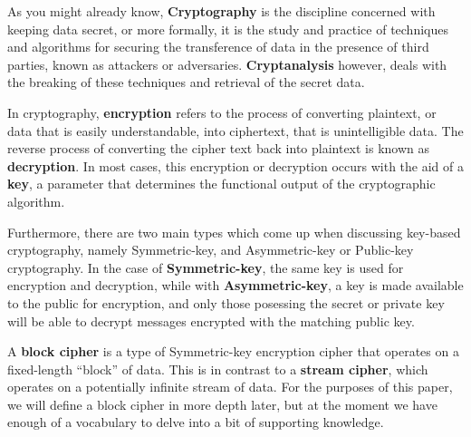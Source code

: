 As you might already know, \textbf{Cryptography} is the discipline concerned
with keeping data secret, or more formally, it is the study and practice of
techniques and algorithms for securing the transference of data in the presence
of third parties, known as attackers or adversaries.  \textbf{Cryptanalysis}
however, deals with the breaking of these techniques and retrieval of the
secret data. 

In cryptography, \textbf{encryption} refers to the process of converting
plaintext, or data that is easily understandable, into ciphertext, that is
unintelligible data. The reverse process of converting the cipher text back
into plaintext is known as \textbf{decryption}. In most cases, this encryption
or decryption occurs with the aid of a \textbf{key}, a parameter that
determines the functional output of the cryptographic algorithm.

Furthermore, there are two main types which come up when discussing key-based
cryptography, namely Symmetric-key, and Asymmetric-key or Public-key
cryptography.  In the case of \textbf{Symmetric-key}, the same key is used for
encryption and decryption, while with \textbf{Asymmetric-key}, a key is made
available to the public for encryption, and only those posessing the secret or
private key will be able to decrypt messages encrypted with the matching public
key.

A \textbf{block cipher} is a type of Symmetric-key encryption cipher that
operates on a fixed-length ``block'' of data. This is in contrast to a
\textbf{stream cipher}, which operates on a potentially infinite stream of
data. For the purposes of this paper, we will define a block cipher in more
depth later, but at the moment we have enough of a vocabulary to delve into a
bit of supporting knowledge.
